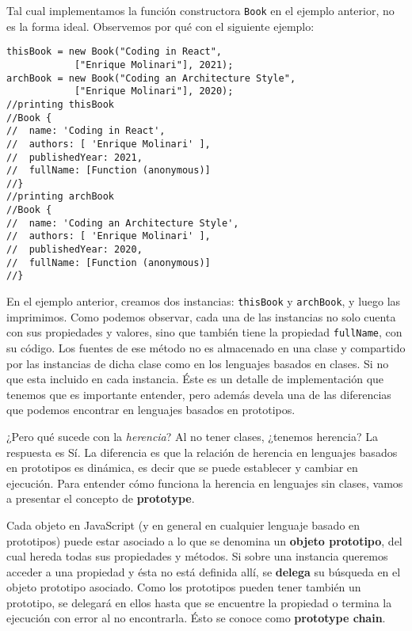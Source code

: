 \documentclass[a4paper, oneside, titlepage, 12pt]{paper}
\begin{document}
Tal cual implementamos la función constructora \texttt{Book} en el ejemplo anterior, no es la forma ideal. Observemos por qué con el siguiente ejemplo:

\begin{verbatim}
thisBook = new Book("Coding in React", 
			["Enrique Molinari"], 2021);
archBook = new Book("Coding an Architecture Style", 
			["Enrique Molinari"], 2020);
//printing thisBook
//Book {
//  name: 'Coding in React',
//  authors: [ 'Enrique Molinari' ],
//  publishedYear: 2021,
//  fullName: [Function (anonymous)]
//}
//printing archBook
//Book {
//  name: 'Coding an Architecture Style',
//  authors: [ 'Enrique Molinari' ],
//  publishedYear: 2020,
//  fullName: [Function (anonymous)]
//}
\end{verbatim}

En el ejemplo anterior, creamos dos instancias: \texttt{thisBook} y \texttt{archBook}, y luego las imprimimos. Como podemos observar, cada una de las instancias no solo cuenta con sus propiedades y valores, sino que también tiene la propiedad \texttt{fullName}, con su código. Los fuentes de ese método no es almacenado en una clase y compartido por las instancias de dicha clase como en los lenguajes basados en clases. Si no que esta incluido en cada instancia. Éste es un detalle de implementación que tenemos que es importante entender, pero además devela una de las diferencias que podemos encontrar en lenguajes basados en prototipos.
\newline

¿Pero qué sucede con la \textit{herencia}? Al no tener clases, ¿tenemos herencia? La respuesta es Sí. La diferencia es que la relación de herencia en lenguajes basados en prototipos es dinámica, es decir que se puede establecer y cambiar en ejecución. Para entender cómo funciona la herencia en lenguajes sin clases, vamos a presentar el concepto de \textbf{prototype}. 
\newline

Cada objeto en JavaScript (y en general en cualquier lenguaje basado en prototipos) puede estar asociado a lo que se denomina un \textbf{objeto prototipo}, del cual hereda todas sus propiedades y métodos. Si sobre una instancia queremos acceder a una propiedad y ésta no está definida allí, se \textbf{delega} su búsqueda en el objeto prototipo asociado. Como los prototipos pueden tener también un prototipo, se delegará en ellos hasta que se encuentre la propiedad o termina la ejecución con error al no encontrarla. Ésto se conoce como \textbf{prototype chain}.
\newline
\end{document}

